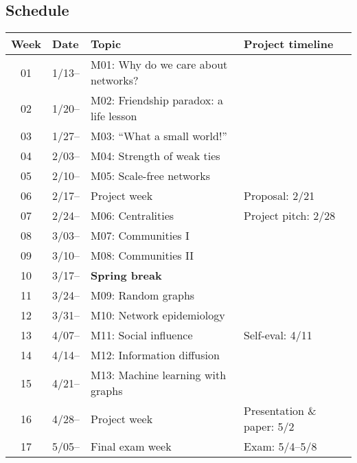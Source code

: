 \subsection{Schedule}\label{sub:schedule}%

\begin{tabular}{@{}clll@{}} \toprule
  Week & Date & Topic & Project timeline\\\midrule
  01 & 1/13-- & M01: Why do we care about networks? & \\
  02 & 1/20-- & M02: Friendship paradox: a life lesson & \\
  03 & 1/27-- & M03: ``What a small world!'' \\
  04 & 2/03-- & M04: Strength of weak ties \\
  05 & 2/10-- & M05: Scale-free networks \\
  06 & 2/17-- & Project week & Proposal: 2/21 \\
  07 & 2/24-- & M06: Centralities & Project pitch: 2/28 \\
  08 & 3/03-- & M07: Communities I \\
  09 & 3/10-- & M08: Communities II \\
  10 & 3/17-- & \textbf{Spring break} \\
  11 & 3/24-- & M09: Random graphs \\
  12 & 3/31-- & M10: Network epidemiology \\
  13 & 4/07-- & M11: Social influence & Self-eval: 4/11 \\
  14 & 4/14-- & M12: Information diffusion \\
  15 & 4/21-- & M13: Machine learning with graphs  \\
  16 & 4/28-- & Project week & Presentation \& paper: 5/2 \\
  17 & 5/05-- & Final exam week & Exam: 5/4--5/8 \\ 
  \bottomrule
\end{tabular}


